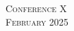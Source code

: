 \documentclass[
	a4paper, %
	10pt, %
]{CSCalendars}
\begin{document}

\begin{center}
	\textsc{\LARGE Conference X}\\ %
	\textsc{\large February 2025} %
\end{center}


\end{document}
